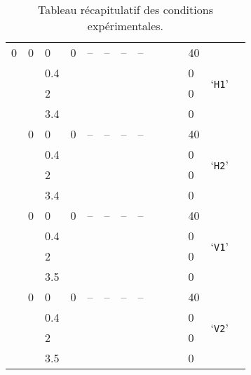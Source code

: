 \begin{table}[!ht]
\begin{tabular}{ llll llll llll lc}
	0 & 0  &  \num{0} & 0 & -- & -- & -- & -- & \echaf{?} & \echaf{?} & \echaf{?} & 40 & \multirow{4}{*}{`\texttt{H1}'} \\
	\echaf{?} & \echaf{?} &  \num{.4} & \echaf{?} & \echaf{?} & \echaf{?} & \echaf{?} & \echaf{?} & \echaf{?} & \echaf{?} & \echaf{?} & 0 &  \\
	\echaf{?} & \echaf{?} &  \num{2} & \echaf{?} & \echaf{?} & \echaf{?} & \echaf{?} & \echaf{?} & \echaf{?} & \echaf{?} & \echaf{?} & 0 & \\
	\echaf{?} & \echaf{?} &  \num{3.4} & \echaf{?} & \echaf{?} & \echaf{?} & \echaf{?} & \echaf{?} & \echaf{?} & \echaf{?} & \echaf{?} & 0 &  \\
	 \hdashline
	0 & 0 &  \num{0} & 0 & -- & -- & -- & -- &  &  &  & 40 & \multirow{4}{*}{`\texttt{H2}'} \\
	 &  &  \num{.4} & & & &&& & \num{} & & 0 & \\
	 &  &  \num{2} & & &&& & & \num{} & & 0 & \\
	 &  &  \num{3.4} & & & &&& & \num{} & & 0 & \\
	 \hdashline
	0 & 0 &  \num{0} & 0 & -- & -- & -- & -- &  &  &  & 40 & \multirow{4}{*}{`\texttt{V1}'} \\
	 &  &  \num{.4} & & & & &&& \num{} & & 0 & \\
	 &  &  \num{2} &  & & &&& & \num{} & & 0 & \\
	 &  &  \num{3.5} &  & & &&& & \num{} & & 0 & \\
	 \hdashline
	0 & 0 &  \num{0} & 0 & -- & -- & -- & -- &  &  &  & 40 & \multirow{4}{*}{`\texttt{V2}'} \\
	 &  &  \num{.4} & & && & && \num{} & & 0 & \\
	 &  &  \num{2} & & & &&& & \num{} & & 0 & \\
	 &  &  \num{3.5} &  & & & & \num{} & & & & 0 & \\
	 \hline
	
	\end{tabular}
	\caption{Tableau récapitulatif des conditions expérimentales.}
	\label{tab:RecapCondExpe}
\end{table}

